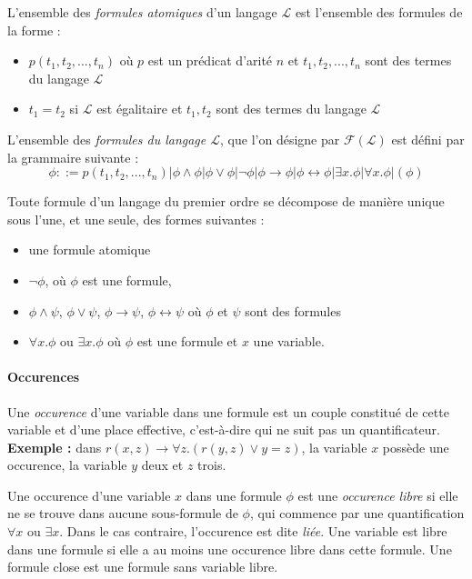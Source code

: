 \documentclass[a4paper]{article}
\begin{document}
  L'ensemble des \textit{formules atomiques} d'un langage $\mathcal{L}$ est l'ensemble
  des formules de la forme :
  \begin{itemize}
    \item $p(t_1, t_2, ..., t_n)$ où $p$ est un prédicat d'arité $n$ et $t_1, t_2, ..., t_n$ 
    sont des termes du langage $\mathcal{L}$
    \item $t_1 = t_2$ si $\mathcal{L}$ est égalitaire et $t_1, t_2$ sont des termes
    du langage $\mathcal{L}$
  \end{itemize}

  L'ensemble des \textit{formules du langage $\mathcal{L}$}, que l'on désigne par
  $\mathcal{F}(\mathcal{L})$ est défini par la grammaire suivante :
  $$ \phi ::= p(t_1, t_2,...,t_n) | \phi \land \phi | \phi \lor \phi | \lnot \phi | \phi \rightarrow \phi | \phi \leftrightarrow \phi | \exists x.\phi | \forall x.\phi | (\phi) $$

  Toute formule d'un langage du premier ordre se décompose de manière unique sous
  l'une, et une seule, des formes suivantes :
  \begin{itemize}
    \item une formule atomique
    \item $\lnot \phi$, où $\phi$ est une formule,
    \item $\phi \land \psi$, $\phi \lor \psi$, $\phi \rightarrow \psi$, $\phi \leftrightarrow \psi$
    où $\phi$ et $\psi$ sont des formules
    \item $\forall x. \phi$ ou $ \exists x.\phi$ où $\phi$ est une formule et $x$ une variable.
   \end{itemize}

   \paragraph{Occurences}
   Une \textit{occurence} d'une variable dans une formule est un couple constitué
   de cette variable et d'une place effective, c'est-à-dire qui ne suit pas 
   un quantificateur. \textbf{Exemple :} dans $r(x,z) \rightarrow \forall z.(r(y,z) \lor y = z)$,
   la variable $x$ possède une occurence, la variable $y$ deux et $z$ trois.

   Une occurence d'une variable $x$ dans une formule $\phi$ est une \textit{occurence libre}
   si elle ne se trouve dans aucune sous-formule de $\phi$, qui commence par une
   quantification $\forall x$ ou $\exists x$. Dans le cas contraire, l'occurence
   est dite \textit{liée}. Une variable est libre dans une formule si elle a 
   au moins une occurence libre dans cette formule. Une formule close est une formule
   sans variable libre.
\end{document}
